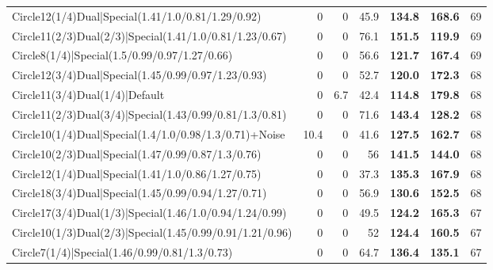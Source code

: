 \begin{tabular}{lrrrllr}
 Circle12(1/4)Dual|Special(1.41/1.0/0.81/1.29/0.92)             &          0   &            0   &          45.9 & \textbf{134.8} & \textbf{168.6} &           69 \\
 Circle11(2/3)Dual(2/3)|Special(1.41/1.0/0.81/1.23/0.67)        &          0   &            0   &          76.1 & \textbf{151.5} & \textbf{119.9} &           69 \\
 Circle8(1/4)|Special(1.5/0.99/0.97/1.27/0.66)                  &          0   &            0   &          56.6 & \textbf{121.7} & \textbf{167.4} &           69 \\
 Circle12(3/4)Dual|Special(1.45/0.99/0.97/1.23/0.93)            &          0   &            0   &          52.7 & \textbf{120.0} & \textbf{172.3} &           68 \\
 Circle11(3/4)Dual(1/4)|Default                                 &          0   &            6.7 &          42.4 & \textbf{114.8} & \textbf{179.8} &           68 \\
 Circle11(2/3)Dual(3/4)|Special(1.43/0.99/0.81/1.3/0.81)        &          0   &            0   &          71.6 & \textbf{143.4} & \textbf{128.2} &           68 \\
 Circle10(1/4)Dual|Special(1.4/1.0/0.98/1.3/0.71)+Noise         &         10.4 &            0   &          41.6 & \textbf{127.5} & \textbf{162.7} &           68 \\
 Circle10(2/3)Dual|Special(1.47/0.99/0.87/1.3/0.76)             &          0   &            0   &          56   & \textbf{141.5} & \textbf{144.0} &           68 \\
 Circle12(1/4)Dual|Special(1.41/1.0/0.86/1.27/0.75)             &          0   &            0   &          37.3 & \textbf{135.3} & \textbf{167.9} &           68 \\
 Circle18(3/4)Dual|Special(1.45/0.99/0.94/1.27/0.71)            &          0   &            0   &          56.9 & \textbf{130.6} & \textbf{152.5} &           68 \\
 Circle17(3/4)Dual(1/3)|Special(1.46/1.0/0.94/1.24/0.99)        &          0   &            0   &          49.5 & \textbf{124.2} & \textbf{165.3} &           67 \\
 Circle10(1/3)Dual(2/3)|Special(1.45/0.99/0.91/1.21/0.96)       &          0   &            0   &          52   & \textbf{124.4} & \textbf{160.5} &           67 \\
 Circle7(1/4)|Special(1.46/0.99/0.81/1.3/0.73)                  &          0   &            0   &          64.7 & \textbf{136.4} & \textbf{135.1} &           67 \\

\end{tabular}
